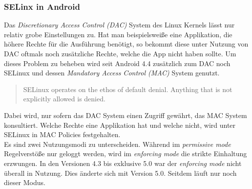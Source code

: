 	\subsubsection{SELinx in Android}
	Das \textit{Discretionary Access Control (DAC)} System des Linux Kernels lässt nur relativ grobe Einstellungen zu. Hat man beispielsweiße eine Applikation, die höhere Rechte für die Ausführung benötigt, so bekommt diese unter Nutzung von DAC oftmals noch zusätzliche Rechte, welche die App nicht haben sollte.	Um dieses Problem zu beheben wird seit Android 4.4 zusätzlich zum DAC noch SELinux und dessen \textit{Mandatory Access Control (MAC)} System genutzt.
	\begin{quote}
	SELinux operates on the ethos of default denial. Anything that is not explicitly allowed is denied.\cite{SELinuxAndroid}
	\end{quote}
\begin{flushleft}
	Dabei wird, nur sofern das DAC System einen Zugriff gewährt, das MAC System konsultiert. Welche Rechte eine Applikation hat und welche nicht, wird unter SELinux in MAC Policies festgehalten.\\
	
	Es sind zwei Nutzungsmodi zu unterscheiden. Während im \textit{permissive mode} Regelverstöße nur geloggt werden, wird im \textit{enforcing mode} die strikte Einhaltung erzwungen. In den Versionen 4.3 bis exklusive 5.0 war der \textit{enforcing mode} nicht überall in Nutzung. Dies änderte sich mit Version 5.0. Seitdem läuft nur noch dieser Modus\cite{SELinuxAndroid}.
\end{flushleft}
	
	
	
	